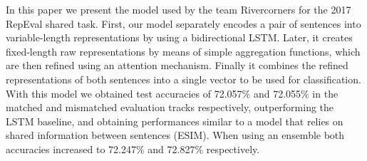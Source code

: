 In this paper we present the model used by the team Rivercorners for the 2017 RepEval shared task. First, our model separately encodes a pair of sentences into variable-length representations by using a bidirectional LSTM. Later, it creates fixed-length raw representations by means of simple aggregation functions, which are then refined using an attention mechanism. Finally it combines the refined representations of both sentences into a single vector to be used for classification. With this model we obtained test accuracies of 72.057\% and 72.055\% in the matched and mismatched evaluation tracks respectively, outperforming the LSTM baseline, and obtaining performances similar to a model that relies on shared information between sentences (ESIM). When using an ensemble both accuracies increased to 72.247\% and 72.827\% respectively.
